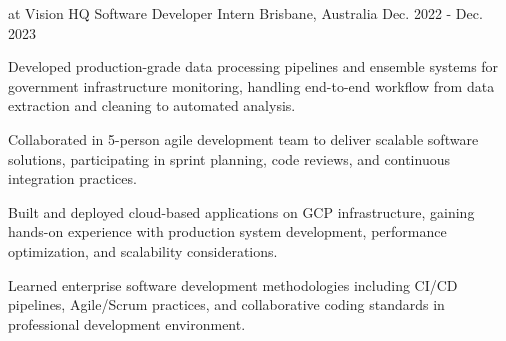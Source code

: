 \begin{cventries}

  \cventry
    {at Vision HQ} %
    {Software Developer Intern} %
    {Brisbane, Australia} %
    {Dec. 2022 - Dec. 2023} %
    {
      \begin{cvitems} %
        \item {Developed production-grade data processing pipelines and ensemble systems for government infrastructure monitoring, handling end-to-end workflow from data extraction and cleaning to automated analysis.}
        \item {Collaborated in 5-person agile development team to deliver scalable software solutions, participating in sprint planning, code reviews, and continuous integration practices.}
        \item {Built and deployed cloud-based applications on GCP infrastructure, gaining hands-on experience with production system development, performance optimization, and scalability considerations.}
        \item {Learned enterprise software development methodologies including CI/CD pipelines, Agile/Scrum practices, and collaborative coding standards in professional development environment.}
      \end{cvitems}
    }


\end{cventries}
